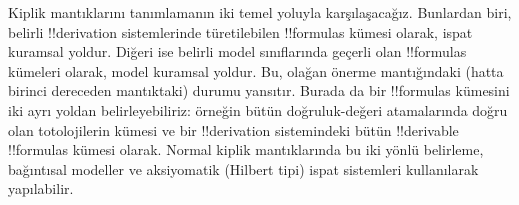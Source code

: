 Kiplik mantıklarını tanımlamanın iki temel yoluyla karşılaşacağız. Bunlardan
biri, belirli !!{derivation} sistemlerinde türetilebilen !!{formula}s kümesi
olarak, ispat kuramsal yoldur. Diğeri ise belirli model sınıflarında geçerli
olan !!{formula}s kümeleri olarak, model kuramsal yoldur. Bu, olağan önerme
mantığındaki (hatta birinci dereceden mantıktaki) durumu yansıtır. Burada da
bir !!{formula}s kümesini iki ayrı yoldan belirleyebiliriz: örneğin bütün
doğruluk-değeri atamalarında doğru olan totolojilerin kümesi ve bir
!!{derivation} sistemindeki bütün !!{derivable} !!{formula}s kümesi olarak.
Normal kiplik mantıklarında bu iki yönlü belirleme, bağıntısal modeller ve
aksiyomatik (Hilbert tipi) ispat sistemleri kullanılarak yapılabilir.
